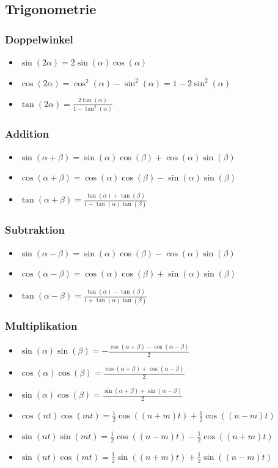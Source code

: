 \documentclass[a4paper,10pt]{article}
\begin{document}
\subsection{Trigonometrie}

\subsubsection{Doppelwinkel}
\begin{itemize}
 \item $\sin(2\alpha) = 2 \sin(\alpha) \cos(\alpha)$
 \item $\cos(2\alpha) = \cos^2(\alpha) - \sin^2(\alpha) = 1 - 2 \sin^2(\alpha)$
 \item $\tan(2\alpha) = \frac{2\tan(\alpha)}{1 - \tan^2(\alpha)}$
\end{itemize}

\subsubsection{Addition}
\begin{itemize}
 \item $\sin(\alpha + \beta) = \sin(\alpha) \cos(\beta) + \cos(\alpha) \sin(\beta)$
 \item $\cos(\alpha + \beta) = \cos(\alpha) \cos(\beta) - \sin(\alpha) \sin(\beta)$
 \item $\tan(\alpha + \beta) = \frac{\tan(\alpha) + \tan(\beta)}{1 - \tan(\alpha) \tan(\beta)}$
\end{itemize}

\subsubsection{Subtraktion}
\begin{itemize}
 \item $\sin(\alpha - \beta) = \sin(\alpha) \cos(\beta) - \cos(\alpha)\sin(\beta)$
 \item $\cos(\alpha - \beta) = \cos(\alpha) \cos(\beta) + \sin(\alpha)\sin(\beta)$
 \item $\tan(\alpha - \beta) = \frac{\tan(\alpha) - \tan(\beta)}{1+\tan(\alpha) \tan(\beta)}$
\end{itemize}

\subsubsection{Multiplikation}
\begin{itemize}
 \item $\sin(\alpha) \sin(\beta) = -\frac{\cos(\alpha + \beta) - \cos(\alpha - \beta)}{2}$
 \item $\cos(\alpha) \cos(\beta) =  \frac{\cos(\alpha + \beta) + \cos(\alpha - \beta)}{2}$
 \item $\sin(\alpha) \cos(\beta) =  \frac{\sin(\alpha + \beta) + \sin(\alpha - \beta)}{2}$
 \item $\cos(nt)\cos(mt) =\frac12 \cos((n+m)t)+\frac12\cos((n-m)t)$
 \item $\sin(nt) \sin(mt) =\frac12\cos((n-m)t)-\frac12\cos((n+m)t)$
 \item $\sin(nt)\cos(mt) =\frac12\sin((n+m)t)+\frac12\sin((n-m)t)$
\end{itemize}
\end{document}
